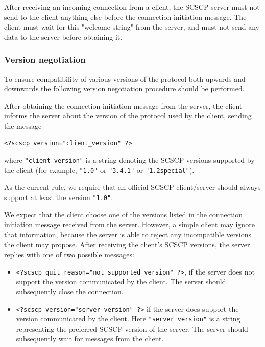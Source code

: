 \documentclass{amsart}
\begin{document}
After receiving an incoming connection from a client, the SCSCP server must not 
send to the client anything else before the connection initiation message. 
The client must wait for this "welcome string" from the server, and must 
not send any data to the server before obtaining it.

\subsubsection{Version negotiation}

To ensure compatibility of various versions of the protocol both upwards and 
downwards the following version negotiation procedure
should be performed.

After obtaining the connection initiation message from the server,
the client informs the server about the version of the protocol 
used by the client, sending the message
\begin{verbatim}
<?scscp version="client_version" ?>
\end{verbatim}
where \verb|"client_version"| is a string denoting the
SCSCP versions supported by the client (for example, 
{\tt "1.0"} or {\tt "3.4.1"} or {\tt "1.2special"}). 

As the current rule, we require that an official SCSCP client/server 
should always support at least the version {\tt "1.0"}. 

We expect that the client choose one of the versions listed in the
connection initiation message received from the server. However,
a simple client may ignore that information, because
the server is able to reject any incompatible versions the client may propose.
After receiving the client's SCSCP versions, the server replies with one of two 
possible messages:
\begin{itemize}
\item \verb|<?scscp quit reason="not supported version" ?>|,
if the server does not support the version communicated by the client. 
The server should subsequently close the connection.
\item \verb|<?scscp version="server_version" ?>| if the server does
support the version communicated by the client. Here \verb|"server_version"| 
is a string representing the preferred SCSCP version of the server. 
The server should subsequently wait for messages from the client.
\end{itemize}
\end{document}
